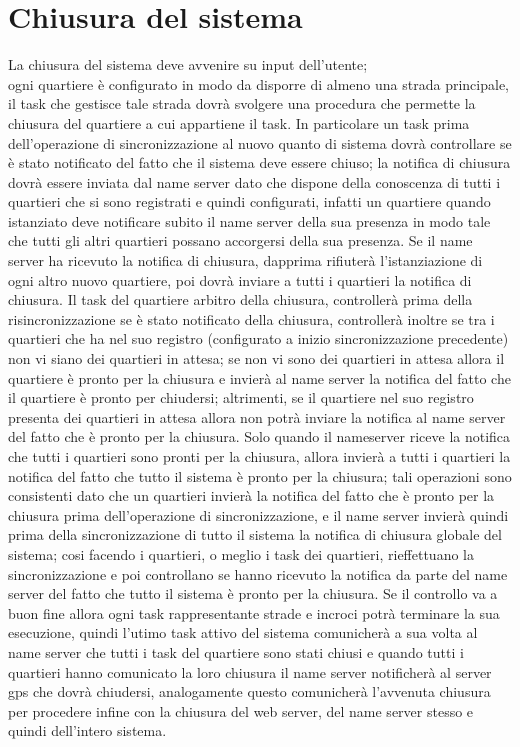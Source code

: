 \section{Chiusura del sistema}
La chiusura del sistema deve avvenire su input dell'utente;\\
ogni quartiere è configurato in modo da disporre di almeno una strada principale, il task che gestisce tale strada dovrà svolgere una procedura che permette la chiusura del quartiere a cui appartiene il task. In particolare un task prima dell'operazione di sincronizzazione al nuovo quanto di sistema dovrà controllare se è stato notificato del fatto che il sistema deve essere chiuso; la notifica di chiusura dovrà essere inviata dal name server dato che dispone della conoscenza di tutti i quartieri che si sono registrati e quindi configurati, infatti un quartiere quando istanziato deve notificare subito il name server della sua presenza in modo tale che tutti gli altri quartieri possano accorgersi della sua presenza. Se il name server ha ricevuto la notifica di chiusura, dapprima rifiuterà l'istanziazione di ogni altro nuovo quartiere, poi dovrà inviare a tutti i quartieri la notifica di chiusura. Il task del quartiere arbitro della chiusura, controllerà prima della risincronizzazione se è stato notificato della chiusura, controllerà inoltre se tra i quartieri che ha nel suo registro (configurato a inizio sincronizzazione precedente) non vi siano dei quartieri in attesa; se non vi sono dei quartieri in attesa allora il quartiere è pronto per la chiusura e invierà al name server la notifica del fatto che il quartiere è pronto per chiudersi; altrimenti, se il quartiere nel suo registro presenta dei quartieri in attesa allora non potrà inviare la notifica al name server del fatto che è pronto per la chiusura. Solo  quando il nameserver riceve la notifica che tutti i quartieri sono pronti per la chiusura, allora invierà a tutti i quartieri la notifica del fatto che tutto il sistema è pronto per la chiusura; tali operazioni sono consistenti dato che un quartieri invierà la notifica del fatto che è pronto per la chiusura prima dell'operazione di sincronizzazione, e il name server invierà quindi prima della sincronizzazione di tutto il sistema la notifica di chiusura globale del sistema; cosi facendo i quartieri, o meglio i task dei quartieri, rieffettuano la sincronizzazione e poi controllano se hanno ricevuto la notifica da parte del name server del fatto che tutto il sistema è pronto per la chiusura. Se il controllo va a buon fine allora ogni task rappresentante strade e incroci potrà terminare la sua esecuzione, quindi l'utimo task attivo del sistema comunicherà a sua volta al name server che tutti i task del quartiere sono stati chiusi e quando tutti i quartieri hanno comunicato la loro chiusura il name server notificherà al server gps che dovrà chiudersi, analogamente questo comunicherà l'avvenuta chiusura per procedere infine con la chiusura del web server, del name server stesso e quindi dell'intero sistema.
